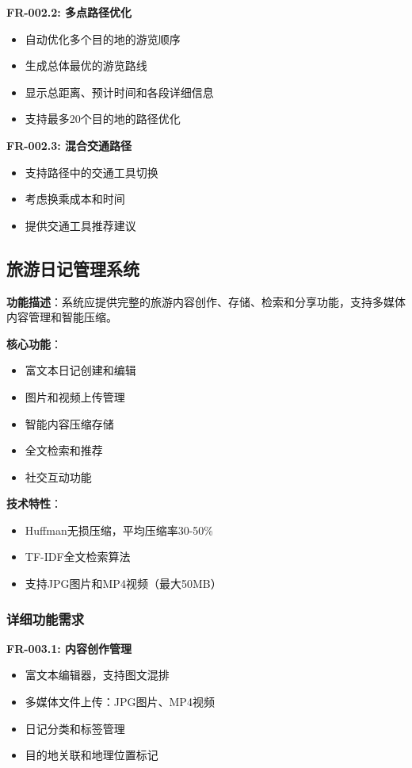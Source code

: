 \documentclass[12pt,a4paper]{article}
\begin{document}
\textbf{FR-002.2: 多点路径优化}
\begin{itemize}
    \item 自动优化多个目的地的游览顺序
    \item 生成总体最优的游览路线
    \item 显示总距离、预计时间和各段详细信息
    \item 支持最多20个目的地的路径优化
\end{itemize}

\textbf{FR-002.3: 混合交通路径}
\begin{itemize}
    \item 支持路径中的交通工具切换
    \item 考虑换乘成本和时间
    \item 提供交通工具推荐建议
\end{itemize}

\subsection{旅游日记管理系统}

\begin{reqbox}[title={FR-003: 旅游日记管理}]
\textbf{功能描述}：系统应提供完整的旅游内容创作、存储、检索和分享功能，支持多媒体内容管理和智能压缩。

\textbf{核心功能}：
\begin{itemize}[nosep]
    \item 富文本日记创建和编辑
    \item 图片和视频上传管理
    \item 智能内容压缩存储
    \item 全文检索和推荐
    \item 社交互动功能
\end{itemize}

\textbf{技术特性}：
\begin{itemize}[nosep]
    \item Huffman无损压缩，平均压缩率30-50\%
    \item TF-IDF全文检索算法
    \item 支持JPG图片和MP4视频（最大50MB）
\end{itemize}
\end{reqbox}

\subsubsection{详细功能需求}

\textbf{FR-003.1: 内容创作管理}
\begin{itemize}
    \item 富文本编辑器，支持图文混排
    \item 多媒体文件上传：JPG图片、MP4视频
    \item 日记分类和标签管理
    \item 目的地关联和地理位置标记
\end{itemize}
\end{document}
